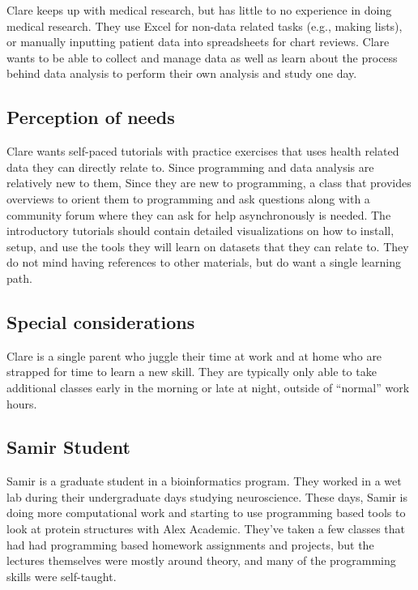 \documentclass[020-persona\_validation.tex]{subfiles}
\begin{document}
            Clare keeps up with medical research,
            but has little to no experience in doing medical research.
            They use Excel for non-data related tasks (e.g., making lists),
            or manually inputting patient data into spreadsheets for chart reviews.
            Clare wants to be able to collect and manage data as well as
            learn about the process behind data analysis to perform their own analysis and study one day.

        \subsection{Perception of needs}

            Clare wants self-paced tutorials with practice exercises that uses health related data they can directly relate to.
            Since programming and data analysis are relatively new to them,
            Since they are new to programming,
            a class that provides overviews to orient them to programming and ask questions along with
            a community forum where they can ask for help asynchronously is needed.
            The introductory tutorials should contain detailed visualizations on how to install, setup, and use
            the tools they will learn on datasets that they can relate to.
            They do not mind having references to other materials,
            but do want a single learning path.

        \subsection{Special considerations}

            Clare is a single parent who juggle their time at work and at home who are strapped for time to learn a new skill.
            They are typically only able to take additional classes early in the morning or late at night,
            outside of ``normal'' work hours.

    \subsection{Samir Student}

        Samir is a graduate student in a bioinformatics program.
        They worked in a wet lab during their undergraduate days studying neuroscience.
        These days, Samir is doing more computational work and
        starting to use programming based tools to look at protein structures with Alex Academic.
        They've taken a few classes that had had programming based homework assignments and projects,
        but the lectures themselves were mostly around theory, and many of the programming skills were self-taught.
\end{document}
